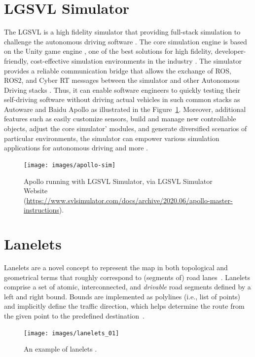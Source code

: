 \documentclass[conference]{IEEEtran}
\begin{document}
\section{LGSVL Simulator}
\label{subsect:lgsvl}
The LGSVL is a high fidelity simulator that providing full-stack simulation to challenge the autonomous driving software \cite{rong2020lgsvl}. The core simulation engine is based on the Unity game engine \cite{rong2020lgsvl}, one of the best solutions for high fidelity, developer-friendly, cost-effective simulation environments in the industry \cite{craighead2008using}. The simulator provides a reliable communication bridge that allows the exchange of ROS, ROS2, and Cyber RT messages between the simulator and other Autonomous Driving stacks \cite{rong2020lgsvl}. Thus, it can enable software engineers to quickly testing their self-driving software without driving actual vehicles in such common stacks as Autoware and Baidu Apollo \cite{rong2020lgsvl} as illustrated in the Figure~\ref{fig:apollosim}. Moreover, additional features such as easily customize sensors, build and manage new controllable objects, adjust the core simulator' modules, and generate diversified scenarios of particular environments, the simulator can empower various simulation applications for autonomous driving and more \cite{rong2020lgsvl}.

\begin{figure}[H]
  \centering
    \texttt{[image: images/apollo-sim]}
  \caption{
    Apollo running with LGSVL Simulator, via LGSVL Simulator Website (\href{https://www.svlsimulator.com/docs/archive/2020.06/apollo-master-instructions}{https://www.svlsimulator.com/docs/archive/2020.06/apollo-master-instructions}).
    }
  \label{fig:apollosim}
\end{figure}


\section{Lanelets}
\label{subsect:lanelets}
Lanelets are a novel concept to represent the map in both topological and geometrical terms that roughly correspond to (segments of) road lanes~\cite{bender2014lanelets}. Lanelets comprise a set of atomic, interconnected, and \emph{drivable} road segments defined by a left and right bound. Bounds are implemented as polylines (i.e., list of points) and implicitly define the traffic direction, which helps determine the route from the given point to the predefined destination~\cite{PekIV20}.

\begin{figure}[H]
  \centering
    \texttt{[image: images/lanelets\_01]}
  \caption{An example of lanelets \cite{althoff2018automatic}.}
  \label{fig:lanelets}
\end{figure}
\end{document}
